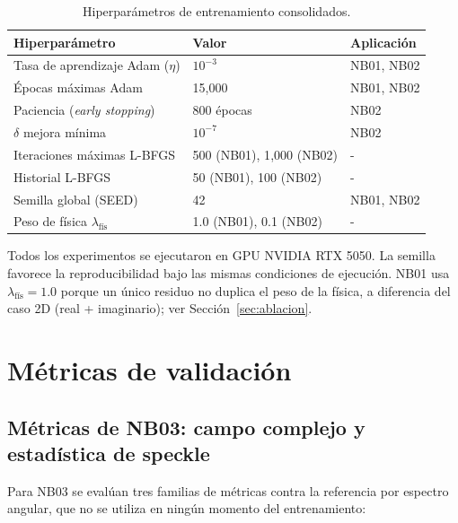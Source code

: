 \begin{table}[htbp]
\centering
\begin{threeparttable}
\caption{Hiperparámetros de entrenamiento consolidados.}
\label{tab:hiperparametros}
\begin{tabular}{lll}
\toprule
Hiperparámetro & Valor & Aplicación \\
\midrule
Tasa de aprendizaje Adam ($\eta$) & $10^{-3}$ & NB01, NB02 \\
Épocas máximas Adam             & 15{,}000  & NB01, NB02 \\
Paciencia (\textit{early stopping}) & 800 épocas & NB02 \\
$\delta$ mejora mínima          & $10^{-7}$ & NB02 \\
Iteraciones máximas L-BFGS      & 500 (NB01), 1{,}000 (NB02) & - \\
Historial L-BFGS                & 50 (NB01), 100 (NB02) & - \\
Semilla global (SEED)           & 42        & NB01, NB02 \\
Peso de física $\lambda_\text{fís}$ & 1.0 (NB01), 0.1 (NB02) & - \\
\bottomrule
\end{tabular}
\begin{tablenotes}\small
    \item Todos los experimentos se ejecutaron en GPU NVIDIA RTX 5050.
    La semilla favorece la reproducibilidad bajo las mismas condiciones de
    ejecución. NB01 usa $\lambda_\text{fís} = 1.0$
    porque un único residuo no duplica el peso de la física, a diferencia del
    caso 2D (real + imaginario); ver Sección~\ref{sec:ablacion}.
\end{tablenotes}
\end{threeparttable}
\end{table}

\section{Métricas de validación}

\subsection{Métricas de NB03: campo complejo y estadística de speckle}
\label{cap3:metricas_nb03}

Para NB03 se evalúan tres familias de métricas contra la referencia por
espectro angular, que no se utiliza en ningún momento del entrenamiento:

